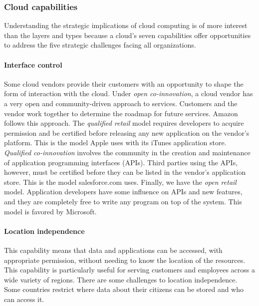 \documentclass[
]{article}
\begin{document}
\hypertarget{cloud-capabilities}{%
\subsubsection*{Cloud capabilities}\label{cloud-capabilities}}

Understanding the strategic implications of cloud computing is of more
interest than the layers and types because a cloud's seven capabilities
offer opportunities to address the five strategic challenges facing all
organizations.

\hypertarget{interface-control}{%
\paragraph*{Interface control}\label{interface-control}}

Some cloud vendors provide their customers with an opportunity to shape
the form of interaction with the cloud. Under \emph{open co-innovation}, a
cloud vendor has a very open and community-driven approach to services.
Customers and the vendor work together to determine the roadmap for
future services. Amazon follows this approach. The \emph{qualified retail}
model requires developers to acquire permission and be certified before
releasing any new application on the vendor's platform. This is the
model Apple uses with its iTunes application store. \emph{Qualified
co-innovation} involves the community in the creation and maintenance of
application programming interfaces (APIs). Third parties using the APIs,
however, must be certified before they can be listed in the vendor's
application store. This is the model salesforce.com uses. Finally, we
have the \emph{open retail} model. Application developers have some influence
on APIs and new features, and they are completely free to write any
program on top of the system. This model is favored by Microsoft.

\hypertarget{location-independence}{%
\paragraph*{Location independence}\label{location-independence}}

This capability means that data and applications can be accessed, with
appropriate permission, without needing to know the location of the
resources. This capability is particularly useful for serving customers
and employees across a wide variety of regions. There are some
challenges to location independence. Some countries restrict where data
about their citizens can be stored and who can access it.
\end{document}
